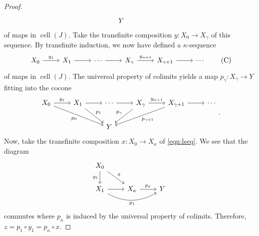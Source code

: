 \documentclass[10pt,letterpaper,cm]{nupset}
\theoremstyle{definition}
\theoremstyle{theorem}
\theoremstyle{remark}
\newcommand{\0}{\mathbf{0}}
\newcommand{\1}{\mathbf{1}}
\newcommand{\2}{\mathbf{2}}
\DeclareMathOperator{\cell}{cell}
\begin{document}
\begin{proof}
\[\begin{tikzcd}
                                         &                                 & Y                &                                                                &                                                     &       
\end{tikzcd}
\] of maps in $\cell(J)$. Take the  transfinite composition $y:X_0\to X_{\gamma}$ of this  sequence. By transfinite induction, we  now have defined a $\kappa$-sequence
\[
\begin{tikzcd}
\label{eqn:lseq} X_0 \arrow[r, "y_1"] & X_1 \arrow[r] & \cdots \arrow[r] & X_{\gamma} \arrow[r, "y_{\alpha+1}"] & X_{\gamma+1} \arrow[r] & \cdots
\end{tikzcd} \tag{C}
\] of maps in $\cell(J)$. The universal property of colimits yields a map $p_{\gamma} : X_{\gamma} \to Y$ fitting into the cocone 
\[
\begin{tikzcd}
X_0 \arrow[r, "y_1"] \arrow[rrd, "p_0"'] & X_1 \arrow[r] \arrow[rd, "p_1"] & \cdots \arrow[r] & X_{\gamma} \arrow[r, "y_{\alpha+1}"] \arrow[ld, "p_{\gamma}"'] & X_{\gamma+1} \arrow[r] \arrow[lld, "p_{\gamma +1}"] & \cdots \\
                                         &                                 & Y                &                                                                &                                                     &       
\end{tikzcd}
.\] Now, take the transfinite composition $x : X_0 \to X_{\kappa}$ of \eqref{eqn:lseq}. We see that the diagram
\[
\begin{tikzcd}
X_0 \arrow[d, "y_1"'] \arrow[rd, "x"]          &                                    &   \\
X_{1} \arrow[r] \arrow[rr, "p_1"', bend right] & X_{\kappa} \arrow[r, "p_{\kappa}"] & Y
\end{tikzcd}
\] commutes where $p_{\kappa}$ is induced by the universal property of colimits. Therefore,  $z = p_1 \circ y_1 = p_{\kappa} \circ x$. 

\medskip


\end{proof}
\end{document}
